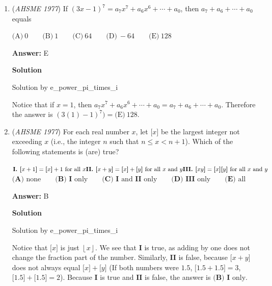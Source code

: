 \begin{enumerate}
 


	\item (\textit{AHSME 1977}) If $(3x-1)^7 = a_7x^7 + a_6x^6 + \cdots + a_0$, then $a_7 + a_6 + \cdots + a_0$ equals 


 $\text{(A)}\ 0 \qquad  \text{(B)}\ 1 \qquad  \text{(C)}\ 64 \qquad  \text{(D)}\ -64 \qquad  \text{(E)}\ 128$

 \textbf{Answer: }E



\textbf{Solution}

Solution by e\_power\_pi\_times\_i

 Notice that if $x=1$, then $a_7x^7 + a_6x^6 + \cdots + a_0 =  a_7 + a_6 + \cdots + a_0$. Therefore the answer is $(3(1)-1)^7) = \boxed{\text{(E)}\ 128}$.

 


	\item (\textit{AHSME 1977}) For each real number $x$, let $\textbf{[}x\textbf{]}$ be the largest integer not exceeding $x$ 
(i.e., the integer $n$ such that $n\le x<n+1$). Which of the following statements is (are) true?


 $\textbf{I. [}x+1\textbf{]}=\textbf{[}x\textbf{]}+1\text{ for all }x \\ \textbf{II. [}x+y\textbf{]}=\textbf{[}x\textbf{]}+\textbf{[}y\textbf{]}\text{ for all }x\text{ and }y \\ \textbf{III. [}xy\textbf{]}=\textbf{[}x\textbf{]}\textbf{[}y\textbf{]}\text{ for all }x\text{ and }y$
$\textbf{(A) }\text{none}\qquad \textbf{(B) }\textbf{I }\text{only}\qquad \textbf{(C) }\textbf{I}\text{ and }\textbf{II}\text{ only}\qquad \textbf{(D) }\textbf{III }\text{only}\qquad \textbf{(E) }\text{all}$

 \textbf{Answer: }B



\textbf{Solution}

Solution by e\_power\_pi\_times\_i

 Notice that $\textbf{[}x\textbf{]}$ is just $\left \lfloor x \right \rfloor$. We see that $\textbf{I}$ is true, as adding by one does not change the fraction part of the number. Similarly, $\textbf{II}$ is false, because $\textbf{[}x+y\textbf{]}$ does not always equal $\textbf{[}x\textbf{]}+\textbf{[}y\textbf{]}$ (If both numbers were $1.5$, $\textbf{[}1.5+1.5\textbf{]} = 3$, $\textbf{[}1.5\textbf{]}+\textbf{[}1.5\textbf{]} = 2$). Because $\textbf{I}$ is true and $\textbf{II}$ is false, the answer is $\boxed{\textbf{(B) }\textbf{I }\text{only}}$.


\end{enumerate}

